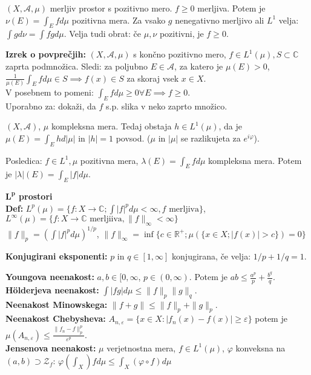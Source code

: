 \documentclass[a4paper,oneside,10pt]{article}
\theoremstyle{definition}
\newcommand{\R}{\ensuremath{\mathbb{R}}}
\renewcommand{\C}{\ensuremath{\mathbb{C}}}
\newcommand{\A}{\ensuremath{\mathcal{A}}}
\renewcommand{\C}{\ensuremath{\mathbb{C}}}
\begin{document}
$(X, \A, \mu)$ merljiv prostor s pozitivno mero. $f \geq 0$ merljiva. Potem je $\nu(E) = \int_E f d \mu$ pozitivna mera. Za vsako $g$ nenegativno merljivo ali $L^1$ velja: $\int g d \nu = \int fg d \mu$. Velja tudi obrat: če $\mu, \nu$ pozitivni, je $f \geq 0$.

\textbf{Izrek o povprečjih:} $(X, \A, \mu)$ s končno pozitivno mero, $f \in L^1(\mu), S\subset \C$ zaprta podmnožica. Sledi: za poljubno $E \in \A$, za katero je $\mu(E) > 0$, $\frac{1}{\mu(E)} \int_E f d \mu \in S \implies f(x) \in S$ za skoraj vsek $x \in X$.\\
V posebnem to pomeni: $\int_E f d \mu \geq 0 \forall E \implies f \geq 0$.\\
Uporabno za: dokaži, da $f$ s.p. slika v neko zaprto množico.

$(X, \A)$, $\mu$ kompleksna mera. Tedaj obstaja $h \in L^1(\mu)$, da je $\mu(E) = \int_E h d |\mu|$ in $|h| = 1$ povsod. ($\mu$ in $|\mu|$ se razlikujeta za $e^{i \varphi}$).

Posledica: $f \in L^1, \mu$ pozitivna mera, $\lambda(E) = \int_E f d \mu$ kompleksna mera. Potem je $|\lambda|(E) = \int_E |f| d \mu$.

\textbf{\large $\boldsymbol L^ {\boldsymbol p}$ prostori} \\
\textbf{Def:} $L^p(\mu) = \{ f\colon X \to \C; \int |f|^p d\mu < \infty, f \text{ merljiva}\}$,
$L^\infty(\mu) = \{ f\colon X \to \C \text{ merljiiva}, \|f\|_\infty < \infty\}$ \\
$\|f\|_p = \left(\int |f|^p d\mu\right)^{1/p}$,
$\|f\|_\infty = \inf\{c \in \R^+; \mu(\{x \in X; |f(x)| > c\}) = 0\}$

\textbf{Konjugirani eksponenti:} $p$ in $q \in [1, \infty]$ konjugirana,
če velja: $1/p + 1/q = 1$.

\textbf{Youngova neenakost:} $a, b \in [0, \infty$, $p \in (0, \infty)$.
Potem je $ab \leq \frac{a^p}{p} + \frac{b^q}{q}$. \\
\textbf{H\"{o}lderjeva neenakost:} $\int |fg|d\mu \leq \|f\|_p\|g\|_q$. \\
\textbf{Neenakost Minowskega:} $\|f+g\| \leq \|f\|_p + \|g\|_p$.
\\
\textbf{Neenakost Chebysheva:} $A_{n, \varepsilon} = \{x \in X: |f_n(x) - f(x)| \geq \varepsilon\}$ potem je $\mu(A_{n, \varepsilon}) \leq \frac{\|f_n - f \|_p^p}{{\varepsilon}^p}$.\\
\textbf{Jensenova neenakost:} $\mu$ verjetnostna mera, $f \in L^1(\mu)$, $\varphi$ konveksna na $(a,b)
\supset \mathcal{Z}_f$: $\varphi(\int_X) f d \mu \leq \int_X (\varphi \circ f) d \mu$
\end{document}
